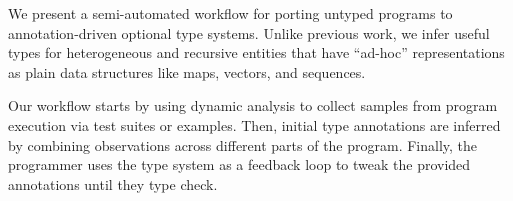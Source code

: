 %







We present a semi-automated workflow for porting
untyped programs to annotation-driven optional type systems.
Unlike previous work, we infer useful types for
heterogeneous and recursive entities that have ``ad-hoc''
representations as plain data structures like maps, vectors, and sequences.

Our workflow starts by using dynamic analysis to collect samples from program execution
via test suites or examples.
Then, initial type annotations are inferred by
combining observations across different parts of the program.
Finally, the programmer uses the type system
as a feedback loop to tweak the provided annotations until they
type check.

